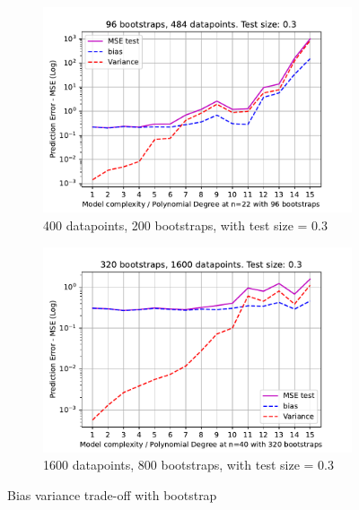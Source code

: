 \documentclass[11pt, a4paper]{article}
\begin{document}
\begin{figure}
  \centering
  \begin{subfigure}{0.49\textwidth}
    \centering
    \includegraphics[width=\textwidth]{figures/EX2_model_complexity_using_bootstrap_function_n_22_testsize_0.3.pdf}
    \caption{400 datapoints, 200 bootstraps, with test size = 0.3}
    \label{fig:bootstrap_bias_var_n_20}
  \end{subfigure}
  \hfill
  \begin{subfigure}{0.49\textwidth}
    \centering
    \includegraphics[width=\textwidth]{figures/EX2_model_complexity_using_bootstrap_function_n_40_testsize_0.3.pdf}
    \caption{1600 datapoints, 800 bootstraps, with test size = 0.3}
    \label{fig:bootstrap_bias_var_n_30}
  \end{subfigure}

  \caption{Bias variance trade-off with bootstrap}
  \label{fig:bootstrap_bias_var}
\end{figure}
\end{document}
